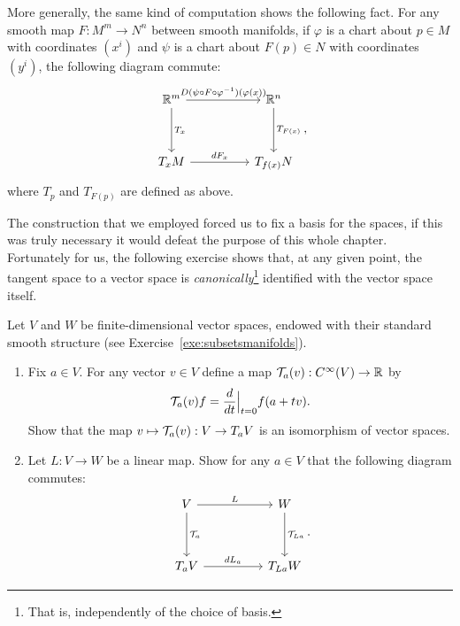 More generally, the same kind of computation shows the following fact. For any smooth map $F:M^m \to N^n$ between smooth manifolds, if $\varphi$ is a chart about $p\in M$ with coordinates $(x^i)$ and $\psi$ is a chart about $F(p)\in N$ with coordinates $(y^i)$, the following diagram commute:
\begin{equation}
  \begin{tikzcd}[row sep=huge, column sep=huge]
    \R^m \arrow[r, "D(\psi \circ F \circ \varphi^{-1})(\varphi(x))"] \arrow[d, "T_x"]
    & \R^n \arrow[d, "T_{F(x)}"] \\
    T_xM \arrow[r, "dF_x"]
    & T_{f(x)}N
  \end{tikzcd},
\end{equation}
where $T_p$ and $T_{F(p)}$ are defined as above.

The construction that we employed forced us to fix a basis for the spaces, if this was truly necessary it would defeat the purpose of this whole chapter.
Fortunately for us, the following exercise shows that, at any given point, the tangent space to a vector space is \emph{canonically}\footnote{That is, independently of the choice of basis.} identified with the vector space itself.

\begin{exercise}[\textit{[homework 2]}]\label{ex:tg_curve_iso}
  Let $V$ and $W$ be finite-dimensional vector spaces, endowed with their standard smooth structure (see Exercise~\ref{exe:subsetsmanifolds}).
  \begin{enumerate}
    \item Fix $a\in V$. For any vector $v\in V$ define a map $\mathcal{T}_a(v) : C^\infty(V) \to \mathbb{R}$ by
    \begin{equation}
      \mathcal{T}_a(v) f = \frac{d}{dt}\Big|_{t=0} f(a + tv).
    \end{equation}
    Show that the map $v\mapsto \mathcal{T}_a(v) : V \to T_aV$ is an isomorphism of vector spaces.
    \item Let $L:V\to W$ be a linear map. Show for any $a\in V$ that the following diagram commutes:
    \begin{equation}
    \begin{tikzcd}[row sep=huge, column sep=huge]
      V \arrow[r, "L"] \arrow[d, "\cT_a"]
      & W \arrow[d, "\cT_{La}"] \\
      T_aV \arrow[r, "dL_a"]
      & T_{La}W
    \end{tikzcd}.
  \end{equation}
  \end{enumerate}
\end{exercise}

